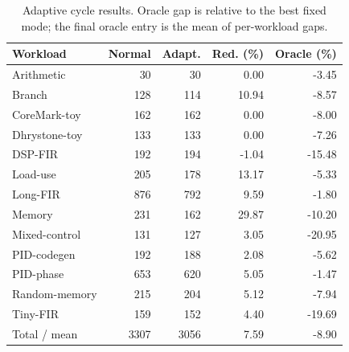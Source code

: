 \begin{table}[t]
\centering
\caption{Adaptive cycle results. Oracle gap is relative to the best fixed mode; the final oracle entry is the mean of per-workload gaps.}
\label{tab:performance}
\footnotesize
\begin{tabular}{lrrrr}
\toprule
Workload & Normal & Adapt. & Red. (\%) & Oracle (\%) \\
\midrule
Arithmetic & 30 & 30 & 0.00 & -3.45 \\
Branch & 128 & 114 & 10.94 & -8.57 \\
CoreMark-toy & 162 & 162 & 0.00 & -8.00 \\
Dhrystone-toy & 133 & 133 & 0.00 & -7.26 \\
DSP-FIR & 192 & 194 & -1.04 & -15.48 \\
Load-use & 205 & 178 & 13.17 & -5.33 \\
Long-FIR & 876 & 792 & 9.59 & -1.80 \\
Memory & 231 & 162 & 29.87 & -10.20 \\
Mixed-control & 131 & 127 & 3.05 & -20.95 \\
PID-codegen & 192 & 188 & 2.08 & -5.62 \\
PID-phase & 653 & 620 & 5.05 & -1.47 \\
Random-memory & 215 & 204 & 5.12 & -7.94 \\
Tiny-FIR & 159 & 152 & 4.40 & -19.69 \\
\midrule
Total / mean & 3307 & 3056 & 7.59 & -8.90 \\
\bottomrule
\end{tabular}
\end{table}
